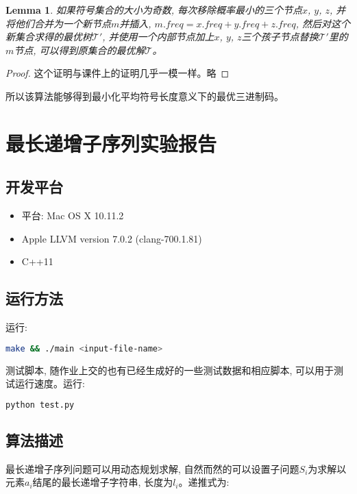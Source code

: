 \documentclass[paper=a4, fontsize=11pt]{scrartcl} %
\numberwithin{equation}{section} %
\numberwithin{figure}{section} %
\numberwithin{table}{section} %
\newtheorem{lemma}[theorem]{Lemma}
\begin{document}
\begin{lemma}
  如果符号集合的大小为奇数, 每次移除概率最小的三个节点$x$, $y$, $z$, 并将他们合并为一个新节点$m$并插入, $m.freq = x.freq + y.freq + z.freq$, 然后对这个新集合求得的最优树$\mathscr{T'}$, 并使用一个内部节点加上$x$, $y$, $z$三个孩子节点替换$\mathscr{T'}$里的$m$节点, 可以得到原集合的最优解$\mathscr{T}$。
\end{lemma}
\begin{proof}
  这个证明与课件上的证明几乎一模一样。略
\end{proof}

所以该算法能够得到最小化平均符号长度意义下的最优三进制码。

\section {最长递增子序列实验报告}

\subsection{开发平台}

\begin{itemize}
\item 平台: Mac OS X 10.11.2
\item Apple LLVM version 7.0.2 (clang-700.1.81)
\item C++11
\end{itemize}

\subsection{运行方法}

运行:
\begin{lstlisting}[language=bash]
  make && ./main <input-file-name>
\end{lstlisting}

测试脚本, 随作业上交的也有已经生成好的一些测试数据和相应脚本, 可以用于测试运行速度。运行:
\begin{lstlisting}[language=bash]
  python test.py
\end{lstlisting}

\subsection{算法描述}

最长递增子序列问题可以用动态规划求解, 自然而然的可以设置子问题$S_i$为求解以元素$a_i$结尾的最长递增子字符串, 长度为$l_i$。递推式为:
\end{document}
